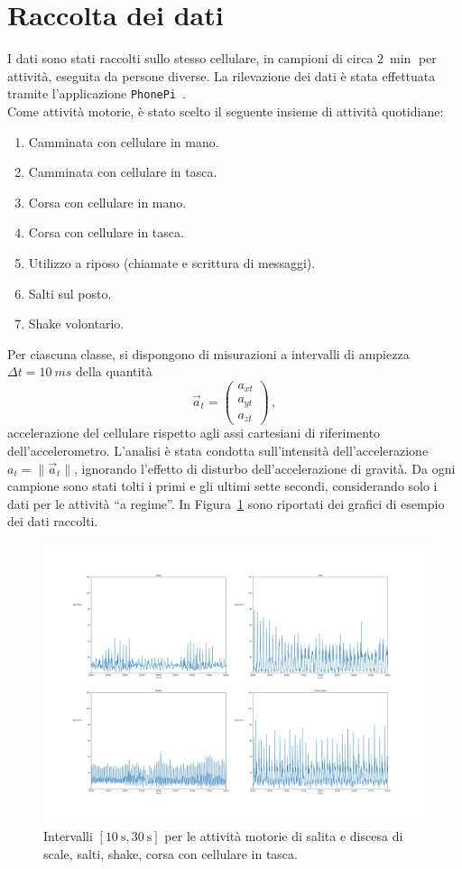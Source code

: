 \documentclass[./main.tex]{subfiles}
\begin{document}
\section{Raccolta dei dati}
I dati sono stati raccolti sullo stesso cellulare, in campioni di circa $\SI{2}{\min}$ per attività, eseguita da persone diverse. La rilevazione dei dati è stata effettuata tramite l'applicazione \texttt{PhonePi}~\cite{kumar2019}.\\
Come attività motorie, è stato scelto il seguente insieme di attività quotidiane:
\begin{enumerate}
	\item Camminata con cellulare in mano.
	\item Camminata con cellulare in tasca.
	\item Corsa con cellulare in mano.
	\item Corsa con cellulare in tasca.
	\item Utilizzo a riposo (chiamate e scrittura di messaggi).
	\item Salti sul posto.
	\item Shake volontario.
\end{enumerate}
Per ciascuna classe, si dispongono di misurazioni a intervalli di ampiezza $\Delta t = \SI{10}{ms}$ della quantità
$$
\vec{a}_t = \begin{pmatrix}
a_{xt}\\
a_{yt}\\
a_{zt}
\end{pmatrix}\,,
$$
accelerazione del cellulare rispetto agli assi cartesiani di riferimento dell'accelerometro. L'analisi è stata condotta sull'intensità dell'accelerazione $a_t = \|\vec{a}_t\|$, ignorando l'effetto di disturbo dell'accelerazione di gravità. Da ogni campione sono stati tolti i primi e gli ultimi sette secondi, considerando solo i dati per le attività ``a regime''.
In Figura~\ref{fig:esempio} sono riportati dei grafici di esempio dei dati raccolti.
\begin{figure}[H]
	\label{fig:esempio}
	\centering
	\includegraphics[width=.8\textwidth, keepaspectratio]{../../figure/espl.png}
	\caption{Intervalli $ [\SI{10}{\second}, \SI{30}{\second}] $ per le attività motorie di salita e discesa di scale, salti, shake, corsa con cellulare in tasca.}
\end{figure}
\end{document}
